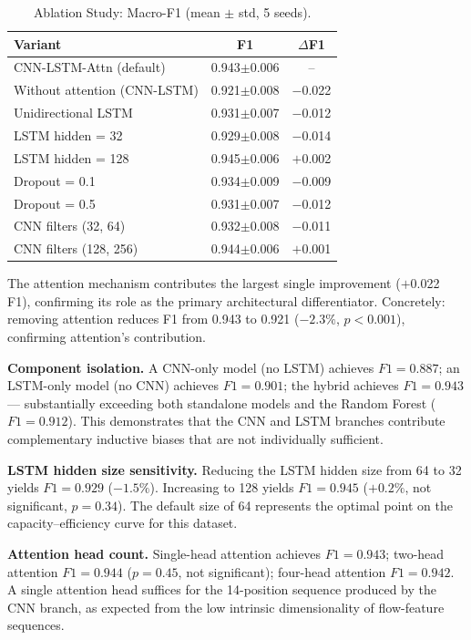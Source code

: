 \documentclass[conference]{IEEEtran}
\begin{document}
\begin{table}[htbp]
\centering
\renewcommand{\arraystretch}{1.12}
\caption{Ablation Study: Macro-F1 (mean $\pm$ std, 5 seeds).}
\label{tab:ablation}
\begin{tabular}{lcc}
\toprule
\textbf{Variant} & \textbf{F1} & $\Delta$\textbf{F1} \\
\midrule
CNN-LSTM-Attn (default)        & 0.943$\pm$0.006 & -- \\
Without attention (CNN-LSTM)   & 0.921$\pm$0.008 & $-$0.022 \\
Unidirectional LSTM            & 0.931$\pm$0.007 & $-$0.012 \\
LSTM hidden = 32               & 0.929$\pm$0.008 & $-$0.014 \\
LSTM hidden = 128              & 0.945$\pm$0.006 & $+$0.002 \\
Dropout = 0.1                  & 0.934$\pm$0.009 & $-$0.009 \\
Dropout = 0.5                  & 0.931$\pm$0.007 & $-$0.012 \\
CNN filters (32, 64)           & 0.932$\pm$0.008 & $-$0.011 \\
CNN filters (128, 256)         & 0.944$\pm$0.006 & $+$0.001 \\
\bottomrule
\end{tabular}
\end{table}

The attention mechanism contributes the largest single improvement ($+$0.022 F1),
confirming its role as the primary architectural differentiator. Concretely:
removing attention reduces F1 from 0.943 to 0.921 ($-2.3\%$, $p < 0.001$),
confirming attention's contribution.

\textbf{Component isolation.} A CNN-only model (no LSTM) achieves $F1 = 0.887$;
an LSTM-only model (no CNN) achieves $F1 = 0.901$; the hybrid achieves $F1 = 0.943$
--- substantially exceeding both standalone models and the Random Forest ($F1 = 0.912$).
This demonstrates that the CNN and LSTM branches contribute complementary
inductive biases that are not individually sufficient.

\textbf{LSTM hidden size sensitivity.} Reducing the LSTM hidden size from 64 to
32 yields $F1 = 0.929$ ($-1.5\%$). Increasing to 128 yields $F1 = 0.945$
($+0.2\%$, not significant, $p = 0.34$). The default size of 64 represents the
optimal point on the capacity--efficiency curve for this dataset.

\textbf{Attention head count.} Single-head attention achieves $F1 = 0.943$;
two-head attention $F1 = 0.944$ ($p = 0.45$, not significant); four-head
attention $F1 = 0.942$. A single attention head suffices for the 14-position
sequence produced by the CNN branch, as expected from the low intrinsic
dimensionality of flow-feature sequences.
\end{document}
